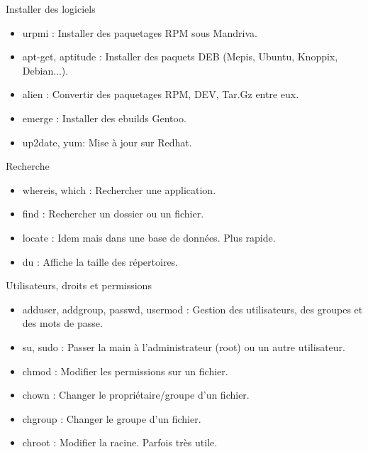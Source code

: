 \documentclass[10pt]{beamer}
\begin{document}
\begin{frame}{Installer des logiciels}
\begin{itemize}
\item \alert{urpmi} : Installer des paquetages RPM sous Mandriva.
\item \alert{apt-get}, \alert{aptitude} : Installer des paquets DEB (Mepis, Ubuntu, Knoppix, Debian...).
\item \alert{alien} : Convertir des paquetages RPM, DEV, Tar.Gz entre eux.
\item \alert{emerge} : Installer des ebuilds Gentoo.
\item \alert{up2date}, yum: Mise à jour sur Redhat.
\end{itemize}
\end{frame}

\begin{frame}{Recherche}
\begin{itemize}
\item \alert{whereis}, \alert{which} : Rechercher une application.
\item \alert{find} : Rechercher un dossier ou un fichier.
\item \alert{locate} : Idem mais dans une base de données. Plus rapide.
\item \alert{du} : Affiche la taille des répertoires.
\end{itemize}
\end{frame}

\begin{frame}{Utilisateurs, droits et permissions}
\begin{itemize}
\item \alert{adduser}, \alert{addgroup}, \alert{passwd}, \alert{usermod} : Gestion des utilisateurs, des groupes et des mots de passe.
\item \alert{su}, \alert{sudo} : Passer la main à l'administrateur (root) ou un autre utilisateur.
\item \alert{chmod} : Modifier les permissions sur un fichier.
\item \alert{chown} : Changer le propriétaire/groupe d'un fichier.
\item \alert{chgroup} : Changer le groupe d'un fichier.
\item \alert{chroot} : Modifier la racine. Parfois très utile.
\end{itemize}
\end{frame}
\end{document}
